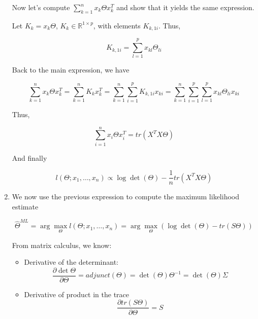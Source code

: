 \documentclass{article}
\begin{document}
\begin{enumerate}
Now let's compute $\sum_{k=1}^{n}x_k\Theta x_k^T$ and show that it yields the same expression. 

Let $K_k = x_k\Theta$,  $K_k\in\mathbb{R}^{1\times p}$, with elements $K_{k,1i}$. Thus,

\begin{equation*}
K_{k,1i} = \sum_{l=1}^p x_{kl}\Theta_{li}
\end{equation*}

Back to the main expression, we have

\begin{equation*}
\sum_{k=1}^{n}x_k\Theta x_k^T = \sum_{k=1}^{n}K_{k} x_k^T = \sum_{k=1}^{n}\sum_{i=1}^{p} K_{k,1i} x_{ki} = \sum_{k=1}^{n}\sum_{i=1}^{p} \sum_{l=1}^p x_{kl}\Theta_{li} x_{ki} 
\end{equation*}

Thus,

\begin{equation*}
\sum_{i=1}^{n}x_i\Theta x_i^T = tr(X^TX\Theta)
\end{equation*}

And finally

\begin{equation*}
l(\Theta;x_1,\dots,x_n) \propto \log \det(\Theta) - \frac{1}{n}tr(X^TX\Theta)
\end{equation*}


\item We now use the previous expression to compute the maximum likelihood estimate

\begin{equation*}
\hat{\Theta}^{ML} = \arg\max_{\Theta} l(\Theta;x_1,\dots,x_n) = \arg\max_{\Theta} \left(\log \det(\Theta) - tr(S\Theta)\right)
\end{equation*}

From matrix calculus, we know:

\begin{itemize}
\item Derivative of the determinant:
\begin{equation*}
\frac{\partial\det\Theta}{\partial \Theta} = adjunct(\Theta) = \det(\Theta) \Theta^{-1} = \det(\Theta) \Sigma
\end{equation*}
\item Derivative of product in the trace 
\begin{equation*}
\frac{\partial tr(S\Theta)}{\partial \Theta} = S
\end{equation*}
\end{itemize}


\end{enumerate}
\end{document}
